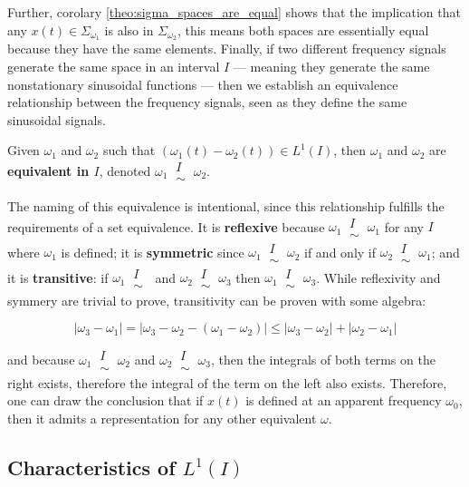 	Further, corolary \ref{theo:sigma_spaces_are_equal} shows that the implication that any $x(t)\in\Sigma_{\omega_1}$ is also in $\Sigma_{\omega_2}$, this means both spaces are essentially equal because they have the same elements. Finally, if two different frequency signals generate the same space in an interval $I$ — meaning they generate the same nonstationary sinusoidal functions — then we establish an equivalence relationship between the frequency signals, seen as they define the same sinusoidal signals.

\newcommand{\equivfreq}[1]{\ \substack{ #1 \\ \sim}\ }

\begin{definition}\label{def:equivalent_freqs} Given $\omega_1$ and $\omega_2$ such that $\left(\omega_1(t)-\omega_2(t)\right)\in L^1\left(I\right)$, then $\omega_1$ and $\omega_2$ are \textbf{equivalent in $I$}, denoted $\omega_1 \equivfreq{I} \omega_2$.\end{definition}

	The naming of this equivalence is intentional, since this relationship fulfills the requirements of a set equivalence. It is \textbf{reflexive} because $\omega_1 \equivfreq{I} \omega_1$ for any $I$ where $\omega_1$ is defined; it is \textbf{symmetric} since $\omega_1 \equivfreq{I} \omega_2$ if and only if $\omega_2\equivfreq{I}\omega_1$; and it is \textbf{transitive}: if $\omega_1\equivfreq{I}$ and $\omega_2\equivfreq{I}\omega_3$ then $\omega_1\equivfreq{I}\omega_3$. While reflexivity and symmery are trivial to prove, transitivity can be proven with some algebra:

\begin{equation} \left\lvert \omega_3 - \omega_1\right\rvert = \left\lvert \omega_3 - \omega_2 - \left(\omega_1 - \omega_2\right)\right\rvert \leq \left\lvert \omega_3 - \omega_2\right\rvert + \left\lvert \omega_2 - \omega_1\right\rvert\end{equation}

	\noindent and because $\omega_1\equivfreq{I}\omega_2$ and $\omega_2\equivfreq{I}\omega_3$, then the integrals of both terms on the right exists, therefore the integral of the term on the left also exists. Therefore, one can draw the conclusion that if $x(t)$ is defined at an apparent frequency $\omega_0$, then it admits a representation for any other equivalent $\omega$. 

\subsection{Characteristics of $L^1\left(I\right)$}\label{subsec:characteristics_l1}

